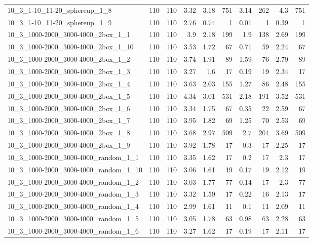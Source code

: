 \begin{center}
\begin{scriptsize}
\begin{longtable}{lrrrrrrrrr}
10\_3\_1-10\_11-20\_sphereup\_1\_8 & 110 & 110 & 3.32 & 3.18 & 751 & 3.14 & 262 & 4.3 & 751\\
10\_3\_1-10\_11-20\_sphereup\_1\_9 & 110 & 110 & 2.76 & 0.74 & 1 & 0.01 & 1 & 0.39 & 1\\
10\_3\_1000-2000\_3000-4000\_2box\_1\_1 & 110 & 110 & 3.9 & 2.18 & 199 & 1.9 & 138 & 2.69 & 199\\
10\_3\_1000-2000\_3000-4000\_2box\_1\_10 & 110 & 110 & 3.53 & 1.72 & 67 & 0.71 & 59 & 2.24 & 67\\
10\_3\_1000-2000\_3000-4000\_2box\_1\_2 & 110 & 110 & 3.74 & 1.91 & 89 & 1.59 & 76 & 2.79 & 89\\
10\_3\_1000-2000\_3000-4000\_2box\_1\_3 & 110 & 110 & 3.27 & 1.6 & 17 & 0.19 & 19 & 2.34 & 17\\
10\_3\_1000-2000\_3000-4000\_2box\_1\_4 & 110 & 110 & 3.63 & 2.03 & 155 & 1.27 & 86 & 2.48 & 155\\
10\_3\_1000-2000\_3000-4000\_2box\_1\_5 & 110 & 110 & 4.34 & 3.01 & 531 & 2.18 & 191 & 3.52 & 531\\
10\_3\_1000-2000\_3000-4000\_2box\_1\_6 & 110 & 110 & 3.34 & 1.75 & 67 & 0.35 & 22 & 2.59 & 67\\
10\_3\_1000-2000\_3000-4000\_2box\_1\_7 & 110 & 110 & 3.95 & 1.82 & 69 & 1.25 & 70 & 2.53 & 69\\
10\_3\_1000-2000\_3000-4000\_2box\_1\_8 & 110 & 110 & 3.68 & 2.97 & 509 & 2.7 & 204 & 3.69 & 509\\
10\_3\_1000-2000\_3000-4000\_2box\_1\_9 & 110 & 110 & 3.92 & 1.78 & 17 & 0.3 & 17 & 2.25 & 17\\
10\_3\_1000-2000\_3000-4000\_random\_1\_1 & 110 & 110 & 3.35 & 1.62 & 17 & 0.2 & 17 & 2.3 & 17\\
10\_3\_1000-2000\_3000-4000\_random\_1\_10 & 110 & 110 & 3.06 & 1.61 & 19 & 0.17 & 19 & 2.12 & 19\\
10\_3\_1000-2000\_3000-4000\_random\_1\_2 & 110 & 110 & 3.03 & 1.77 & 77 & 0.14 & 17 & 2.3 & 77\\
10\_3\_1000-2000\_3000-4000\_random\_1\_3 & 110 & 110 & 3.32 & 1.59 & 17 & 0.22 & 16 & 2.13 & 17\\
10\_3\_1000-2000\_3000-4000\_random\_1\_4 & 110 & 110 & 2.99 & 1.61 & 11 & 0.1 & 11 & 2.09 & 11\\
10\_3\_1000-2000\_3000-4000\_random\_1\_5 & 110 & 110 & 3.05 & 1.78 & 63 & 0.98 & 63 & 2.28 & 63\\
10\_3\_1000-2000\_3000-4000\_random\_1\_6 & 110 & 110 & 3.27 & 1.62 & 17 & 0.19 & 17 & 2.11 & 17\\

\end{longtable}
\end{scriptsize}
\end{center}
